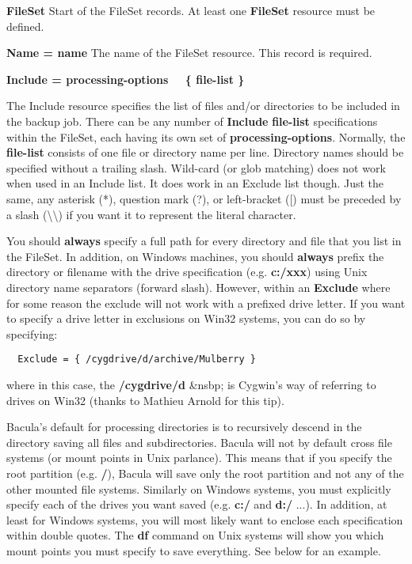 \begin{description}

\item {\bf FileSet}
Start of the FileSet records. At least one {\bf FileSet}  resource must be
defined. 

\item {\bf Name = \lt{}name\gt{}}
The name of the FileSet resource.  This record is required. 

\item {\bf Include = \lt{}processing-options\gt{} 
\ \ \{ \lt{}file-list\gt{} \} 
}

The Include resource specifies the list of files and/or directories to be
included in the backup job. There can be any number of {\bf Include} {\bf
file-list} specifications within the FileSet, each having its own set of {\bf
processing-options}. Normally, the {\bf file-list} consists of one file or
directory name per line. Directory names should be specified without a
trailing slash. Wild-card (or glob matching) does not work when used in an
Include list. It does work in an Exclude list though. Just the same, any
asterisk (*), question mark (?), or left-bracket ([) must be preceded by a
slash (\textbackslash{}\textbackslash{}) if you want it to represent the
literal character. 

You should {\bf always} specify a full path for every directory and file that
you list in the FileSet. In addition, on Windows machines, you should {\bf
always} prefix the directory or filename with the drive specification (e.g.
{\bf c:/xxx}) using Unix directory name separators (forward slash). However,
within an {\bf Exclude} where for some reason the exclude will not work with a
prefixed drive letter. If you want to specify a drive letter in exclusions on
Win32 systems, you can do so by specifying: 

\footnotesize
\begin{verbatim}
  Exclude = { /cygdrive/d/archive/Mulberry }
\end{verbatim}
\normalsize

where in this case, the {\bf /cygdrive/d} \&nsbp; is Cygwin's way of referring
to drives on Win32 (thanks to Mathieu Arnold for this tip). 

Bacula's default for processing directories is to recursively descend in the
directory saving all files and subdirectories. Bacula will not by default
cross file systems (or mount points in Unix parlance). This means that if you
specify the root partition (e.g. {\bf /}), Bacula will save only the root
partition and not any of the other mounted file systems. Similarly on Windows
systems, you must explicitly specify each of the drives you want saved (e.g.
{\bf c:/} and {\bf d:/} ...). In addition, at least for Windows systems, you
will most likely want to enclose each specification within double quotes. The
{\bf df} command on Unix systems will show you which mount points you must
specify to save everything. See below for an example. 


\end{description}
